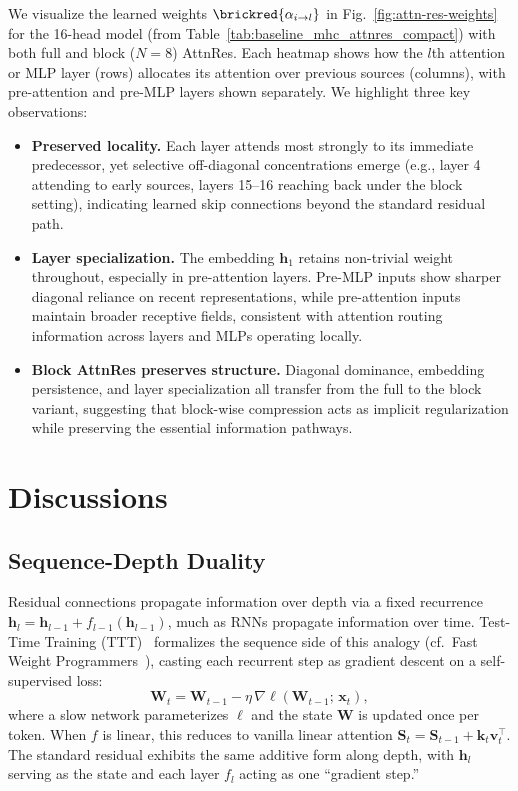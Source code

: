\label{sec:analysis}
 We visualize the learned weights $\brickred{\alpha_{i \to l}}$ in Fig.~\ref{fig:attn-res-weights} for the 16-head model (from Table~\ref{tab:baseline_mhc_attnres_compact}) with both full and block ($N{=}8$) AttnRes.
Each heatmap shows how the $l$th attention or MLP layer (rows) allocates its attention over previous sources (columns), with pre-attention and pre-MLP layers shown separately.
We highlight three key observations:
\begin{itemize}[leftmargin=*]
    \item \textbf{Preserved locality.} Each layer attends most strongly to its immediate predecessor, yet selective off-diagonal concentrations emerge (e.g., layer 4 attending to early sources, layers 15--16 reaching back under the block setting), indicating learned skip connections beyond the standard residual path.
    \item \textbf{Layer specialization.} The embedding $\bm{h}_1$ retains non-trivial weight throughout, especially in pre-attention layers. Pre-MLP inputs show sharper diagonal reliance on recent representations, while pre-attention inputs maintain broader receptive fields, consistent with attention routing information across layers and MLPs operating locally.
    \item \textbf{Block AttnRes preserves structure.} Diagonal dominance, embedding persistence, and layer specialization all transfer from the full to the block variant, suggesting that block-wise compression acts as implicit regularization while preserving the essential information pathways.
\end{itemize}


\section{Discussions}

\subsection{Sequence-Depth Duality}
\label{sec:depth-ttt}

Residual connections propagate information over depth via a fixed recurrence $\bm{h}_{l} = \bm{h}_{l-1} + f_{l-1}(\bm{h}_{l-1})$, much as RNNs propagate information over time.
Test-Time Training (TTT)~\cite{sun-2024-learning} formalizes the sequence side of this analogy (cf.\ Fast Weight Programmers~\cite{schmidhuber1992learning,munkhdalai-2019-metalearned}), casting each recurrent step as gradient descent on a self-supervised loss:
\begin{equation}
    \mathbf{W}_t = \mathbf{W}_{t-1} - \eta\,\nabla\ell(\mathbf{W}_{t-1};\, \bm{x}_t),
\end{equation}
where a slow network parameterizes $\ell$ and the state $\mathbf{W}$ is updated once per token.
When $f$ is linear, this reduces to vanilla linear attention $\mathbf{S}_{t} = \mathbf{S}_{t-1} + \bm{k}_t\bm{v}_t^\top$.
The standard residual exhibits the same additive form along depth, with $\bm{h}_l$ serving as the state and each layer $f_l$ acting as one ``gradient step.''

